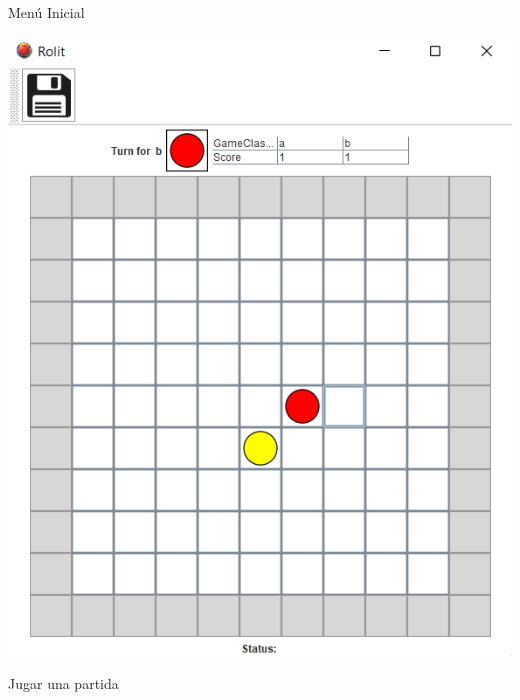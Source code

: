 \documentclass[../DocumentoOficial.tex]{subfiles}
\begin{document}
\begin{sprint}[6]
\begin{center}
Menú Inicial
\end{center}

\newpage

\begin{center}
\includegraphics[scale=1]{partida-sprint-6.png}

Jugar una partida
\end{center}


\end{sprint}
\end{document}
